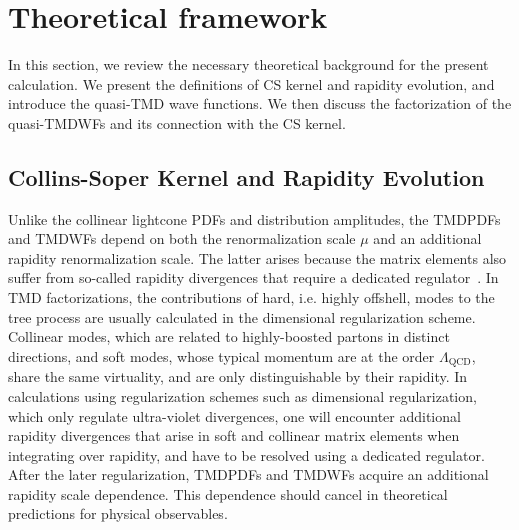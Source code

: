\section{Theoretical framework}
\label{sec:framework}
 
In this section, we review the necessary theoretical background
for the present calculation. We present the definitions of
CS kernel and rapidity evolution, and introduce the quasi-TMD wave functions. We then discuss the factorization of the quasi-TMDWFs
and its connection with the CS kernel. 
   
\subsection{Collins-Soper Kernel and Rapidity Evolution}


Unlike the collinear  lightcone  PDFs and  distribution amplitudes,  the TMDPDFs and TMDWFs depend on both the renormalization scale $\mu$ and an additional rapidity renormalization scale. The latter arises because the matrix elements also suffer from so-called rapidity divergences that require a dedicated regulator~\cite{Collins:1981uk,Becher:2010tm,Chiu:2011qc}.  In TMD factorizations, the contributions of hard, i.e. highly offshell, modes to the tree process are usually calculated in the dimensional regularization scheme. Collinear modes, which are related to  highly-boosted partons in distinct directions, and soft modes, whose typical momentum are  at the order  $\Lambda_{\mathrm{QCD}}$, share the same virtuality, %
and are only distinguishable by their rapidity. In calculations using regularization schemes such as dimensional regularization, which only regulate ultra-violet divergences, one will encounter additional rapidity divergences that arise in soft and collinear matrix elements when integrating over rapidity, and have to be resolved using a dedicated regulator. After the later regularization, TMDPDFs and TMDWFs acquire an additional rapidity scale dependence. This dependence should cancel in theoretical predictions for physical observables. 

